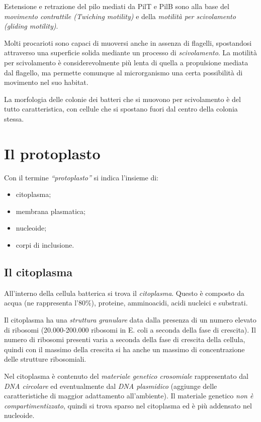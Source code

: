 \documentclass[11pt]{book}
\begin{document}
Estensione e retrazione del pilo mediati da PilT e PilB sono alla base del \emph{movimento contrattile (Twiching motility)} e della \emph{motilità per scivolamento (gliding motility)}.

\vspace{1em}
Molti procarioti sono capaci di muoversi anche in assenza di flagelli, spostandosi attraverso una superficie solida mediante un processo di \emph{scivolamento}. La motilità per scivolamento è considerevolmente più lenta di quella a propulsione mediata dal flagello, ma permette comunque al microrganismo una certa possibilità di movimento nel suo habitat.

La morfologia delle colonie dei batteri che si muovono per scivolamento è del tutto caratteristica, con cellule che si spostano fuori dal centro della colonia stessa.

\chapter{Il protoplasto}

Con il termine \emph{``protoplasto''} si indica l'insieme di:
\begin{itemize}
\item citoplasma; 
\item membrana plasmatica;
\item nucleoide;
\item corpi di inclusione.
\end{itemize}

\section{Il citoplasma}
All'interno della cellula batterica si trova il \emph{citoplasma}. Questo è composto da acqua (ne rappresenta l'80$\%$), proteine, amminoacidi, acidi nucleici e substrati.

Il citoplasma ha una \emph{struttura granulare} data dalla presenza di un numero elevato di ribosomi (20.000-200.000 ribosomi in E. coli a seconda della fase di crescita). Il numero di ribosomi presenti varia a seconda della fase di crescita della cellula, quindi con il massimo della crescita si ha anche un massimo di concentrazione delle strutture ribosomiali.

Nel citoplasma è contenuto del \emph{materiale genetico crosomiale} rappresentato dal \emph{DNA circolare} ed eventualmente dal \emph{DNA plasmidico} (aggiunge delle caratteristiche di maggior adattamento all'ambiente). Il materiale genetico \emph{non è compartimentizzato}, quindi si trova sparso nel citoplasma ed è più addensato nel nucleoide.
\end{document}
